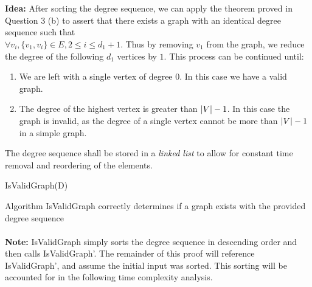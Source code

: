 \documentclass[12pt]{article}
\newenvironment{lemma}[2][Lemma]{\begin{trivlist}
\item[\hskip \labelsep {\bfseries #1}\hskip \labelsep {\bfseries #2.}]}{\end{trivlist}}
\newenvironment{question}[2][Question]{\begin{trivlist}
\item[\hskip \labelsep {\bfseries #1}\hskip \labelsep {\bfseries #2.}]}{\end{trivlist}}
\DeclarePairedDelimiter\abs{\lvert}{\rvert}%
\begin{document}
\begin{question}{3 (c)}
  \leavevmode \\ \\
  \textbf{Idea:} After sorting the degree sequence, we can apply the theorem
  proved in Question 3 (b) to assert that there exists a graph with an identical
  degree sequence such that \\
  $\forall v_{i}, \{v_{1}, v_{i}\} \in E, 2 \leq i \leq d_{1}+1$.  Thus by
  removing $v_{1}$ from the graph, we reduce the degree of the following $d_{1}$
  vertices by $1$.  This process can be continued until:
  \begin{enumerate}
      \item We are left with a single vertex of degree 0.  In this case we have
        a valid graph.
      \item The degree of the highest vertex is greater than $\abs{V} - 1$.
        In this case the graph is invalid, as the degree of a single vertex
        cannot be more than $\abs{V} - 1$ in a simple graph.
  \end{enumerate}
  The degree sequence shall be stored in a \textit{linked list} to allow for
  constant time removal and reordering of the elements.

  \begin{algorithm}[H]
    \caption{IsValidGraph(D)}
    \BlankLine



    \BlankLine
  \end{algorithm}

  \begin{lemma}{3.1} Algorithm IsValidGraph correctly determines if a graph exists
    with the provided degree sequence
    \leavevmode \\ \\
    \textbf{Note:} IsValidGraph simply sorts the degree sequence in descending order
    and then calls IsValidGraph'.  The remainder of this proof will reference
    IsValidGraph', and assume the initial input was sorted.  This sorting will
    be accounted for in the following time complexity analysis.\\


\end{lemma}
\end{question}
\end{document}
